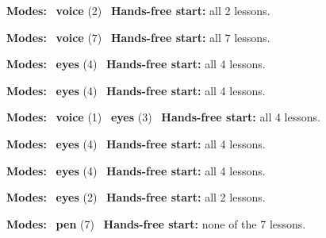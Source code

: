 \expandafter\def\csname hlchaptermodality6\endcsname{%
  {\small\noindent
    \textbf{Modes:} \hlvoicesign{}~\textbf{voice} (2)\quad
    \hlvoicesign{}~\textbf{Hands-free start:} all 2 lessons.%
    \par}\medskip
}

\expandafter\def\csname hlchaptermodality7\endcsname{%
  {\small\noindent
    \textbf{Modes:} \hlvoicesign{}~\textbf{voice} (7)\quad
    \hlvoicesign{}~\textbf{Hands-free start:} all 7 lessons.%
    \par}\medskip
}

\expandafter\def\csname hlchaptermodality8\endcsname{%
  {\small\noindent
    \textbf{Modes:} \hlsightsign{}~\textbf{eyes} (4)\quad
    \hlvoicesign{}~\textbf{Hands-free start:} all 4 lessons.%
    \par}\medskip
}

\expandafter\def\csname hlchaptermodality9\endcsname{%
  {\small\noindent
    \textbf{Modes:} \hlsightsign{}~\textbf{eyes} (4)\quad
    \hlvoicesign{}~\textbf{Hands-free start:} all 4 lessons.%
    \par}\medskip
}

\expandafter\def\csname hlchaptermodality10\endcsname{%
  {\small\noindent
    \textbf{Modes:} \hlvoicesign{}~\textbf{voice} (1) \quad \hlsightsign{}~\textbf{eyes} (3)\quad
    \hlvoicesign{}~\textbf{Hands-free start:} all 4 lessons.%
    \par}\medskip
}

\expandafter\def\csname hlchaptermodality11\endcsname{%
  {\small\noindent
    \textbf{Modes:} \hlsightsign{}~\textbf{eyes} (4)\quad
    \hlvoicesign{}~\textbf{Hands-free start:} all 4 lessons.%
    \par}\medskip
}

\expandafter\def\csname hlchaptermodality12\endcsname{%
  {\small\noindent
    \textbf{Modes:} \hlsightsign{}~\textbf{eyes} (4)\quad
    \hlvoicesign{}~\textbf{Hands-free start:} all 4 lessons.%
    \par}\medskip
}

\expandafter\def\csname hlchaptermodality13\endcsname{%
  {\small\noindent
    \textbf{Modes:} \hlsightsign{}~\textbf{eyes} (2)\quad
    \hlvoicesign{}~\textbf{Hands-free start:} all 2 lessons.%
    \par}\medskip
}

\expandafter\def\csname hlchaptermodality14\endcsname{%
  {\small\noindent
    \textbf{Modes:} \hlpensign{}~\textbf{pen} (7)\quad
    \hlvoicesign{}~\textbf{Hands-free start:} none of the 7 lessons.%
    \par}\medskip
}

